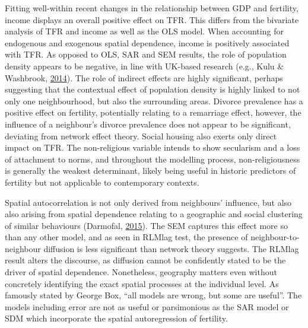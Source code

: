 \documentclass[12pt,twoside]{reedthesis}
\begin{document}
Fitting well-within recent changes in the relationship between GDP and fertility, income displays an overall positive effect on TFR. This differs from the bivariate analysis of TFR and income as well as the OLS model. When accounting for endogenous and exogenous spatial dependence, income is positively associated with TFR. As opposed to OLS, SAR and SEM results, the role of population density appears to be negative, in line with UK-based research (e.g., Kulu \& Washbrook, \protect\hyperlink{ref-kulu2014}{2014}). The role of indirect effects are highly significant, perhaps suggesting that the contextual effect of population density is highly linked to not only one neighbourhood, but also the surrounding areas. Divorce prevalence has a positive effect on fertility, potentially relating to a remarriage effect, however, the influence of a neighbour's divorce prevalence does not appear to be significant, deviating from network effect theory. Social housing also exerts only direct impact on TFR. The non-religious variable intends to show secularism and a loss of attachment to norms, and throughout the modelling process, non-religiousness is generally the weakest determinant, likely being useful in historic predictors of fertility but not applicable to contemporary contexts.

Spatial autocorrelation is not only derived from neighbours' influence, but also also arising from spatial dependence relating to a geographic and social clustering of similar behaviours (Darmofal, \protect\hyperlink{ref-darmofal2015}{2015}). The SEM captures this effect more so than any other model, and as seen in RLMlag test, the presence of neighbour-to-neighbour diffusion is less significant than network theory suggests. The RLMlag result alters the discourse, as diffusion cannot be confidently stated to be the driver of spatial dependence. Nonetheless, geography matters even without concretely identifying the exact spatial processes at the individual level. As famously stated by George Box, ``all models are wrong, but some are useful''. The models including error are not as useful or parsimonious as the SAR model or SDM which incorporate the spatial autoregression of fertility.
\end{document}

